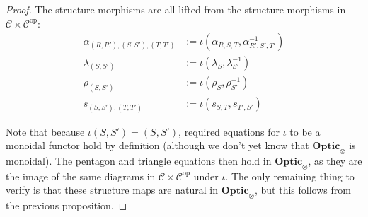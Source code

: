 \documentclass[11pt,letterpaper]{article}
\theoremstyle{plain}
\theoremstyle{definition}
\newcommand{\C}{\mathscr{C}}
\newcommand{\Optic}{\mathbf{Optic}}
\newcommand{\op}{\mathrm{op}}
\newcommand{\todo}[1]{\textcolor{red}{\small #1}}
\begin{document}
\begin{proof}

  The structure morphisms are all lifted from the structure morphisms in $\C \times \C^\op$:
  \begin{align*}
    \alpha_{(R, R'), (S, S'), (T, T')} &:= \iota(\alpha_{R,S,T}, \alpha_{R',S',T'}^{-1}) \\
    \lambda_{(S, S')} &:= \iota(\lambda_{S}, \lambda_{S'}^{-1}) \\
    \rho_{(S, S')} &:= \iota(\rho_{S}, \rho_{S'}^{-1}) \\
    s_{(S, S'), (T, T')} &:= \iota(s_{S, T}, s_{T', S'})
  \end{align*}

  Note that because $\iota(S, S') = (S, S')$, required equations for $\iota$ to be a monoidal functor hold by definition (although we don't yet know that $\Optic_\otimes$ is monoidal). The pentagon and triangle equations then hold in $\Optic_\otimes$, as they are the image of the same diagrams in $\C \times \C^\op$ under $\iota$. The only remaining thing to verify is that these structure maps are natural in $\Optic_\otimes$, but this follows from the previous proposition.


\end{proof}
\end{document}
